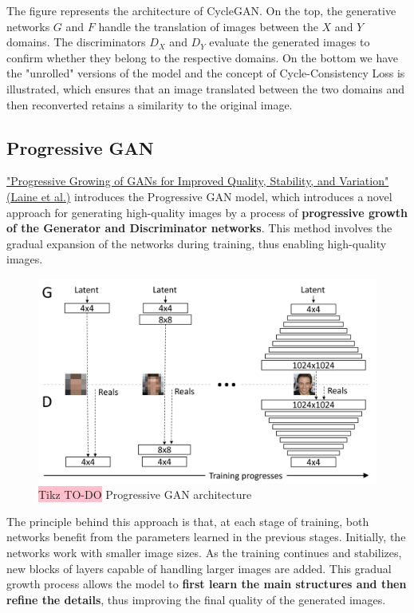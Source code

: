The figure represents the architecture of CycleGAN. On the top, the generative networks 
$G$ and $F$ handle the translation of images between the $X$ and $Y$ domains. The discriminators $D_X$ and $D_Y$ evaluate the generated images to confirm whether they belong to the respective domains. On the bottom we have the "unrolled" versions of the model and the concept of Cycle-Consistency Loss is illustrated, which ensures that an image translated between the two domains and then reconverted retains a similarity to the original image.

\subsection{Progressive GAN}

\href{https://arxiv.org/pdf/1710.10196}{"Progressive Growing of GANs for Improved Quality, Stability, and Variation" (Laine et al.)} introduces the Progressive GAN model, which introduces a novel approach for generating high-quality images by a process of \textbf{progressive growth of the Generator and Discriminator networks}. This method involves the gradual expansion of the networks during training, thus enabling high-quality images.

\begin{figure}[!htbp]
    \centering
    \includegraphics[width=0.75\linewidth]{tikz/chapter9 - Progressive GAN.png}
    \caption{{\color{red}\colorbox{pink}{Tikz TO-DO}} Progressive GAN architecture}
\end{figure}

The principle behind this approach is that, at each stage of training, both networks benefit from the parameters learned in the previous stages. Initially, the networks work with smaller image sizes. As the training continues and stabilizes, new blocks of layers capable of handling larger images are added. This gradual growth process allows the model to \textbf{first learn the main structures and then refine the details}, thus improving the final quality of the generated images.



